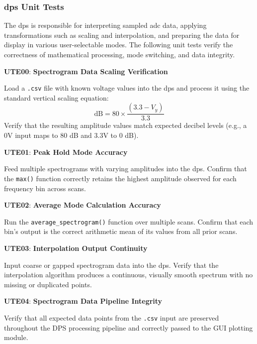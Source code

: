\documentclass[class=report,11pt,crop=false]{standalone}
\begin{document}
	\subsubsection{\acrlong{dps} Unit Tests}
	
	The \acrshort{dps} is responsible for interpreting sampled \acrshort{adc} data, applying transformations such as scaling and interpolation, and preparing the data for display in various user-selectable modes. The following unit tests verify the correctness of mathematical processing, mode switching, and data integrity.
	
	\begin{center}
		\textbf{UTE00}: \textbf{Spectrogram Data Scaling Verification}
	\end{center}
	Load a \texttt{.csv} file with known voltage values into the \acrshort{dps} and process it using the standard vertical scaling equation:
	\[
	\text{dB} = 80 \times \frac{(3.3 - V_y)}{3.3}
	\]
	Verify that the resulting amplitude values match expected decibel levels (e.g., a 0V input maps to 80 dB and 3.3V to 0 dB).
	
	\begin{center}
		\textbf{UTE01}: \textbf{Peak Hold Mode Accuracy}
	\end{center}
	Feed multiple spectrograms with varying amplitudes into the \acrshort{dps}. Confirm that the \texttt{max()} function correctly retains the highest amplitude observed for each frequency bin across scans.
	
	\begin{center}
		\textbf{UTE02}: \textbf{Average Mode Calculation Accuracy}
	\end{center}
	Run the \texttt{average\_spectrogram()} function over multiple scans. Confirm that each bin’s output is the correct arithmetic mean of its values from all prior scans.
	
	\begin{center}
		\textbf{UTE03}: \textbf{Interpolation Output Continuity}
	\end{center}
	Input coarse or gapped spectrogram data into the \acrshort{dps}. Verify that the interpolation algorithm produces a continuous, visually smooth spectrum with no missing or duplicated points.
	
	\begin{center}
		\textbf{UTE04}: \textbf{Spectrogram Data Pipeline Integrity}
	\end{center}
	Verify that all expected data points from the \texttt{.csv} input are preserved throughout the DPS processing pipeline and correctly passed to the GUI plotting module.
		
\end{document}
